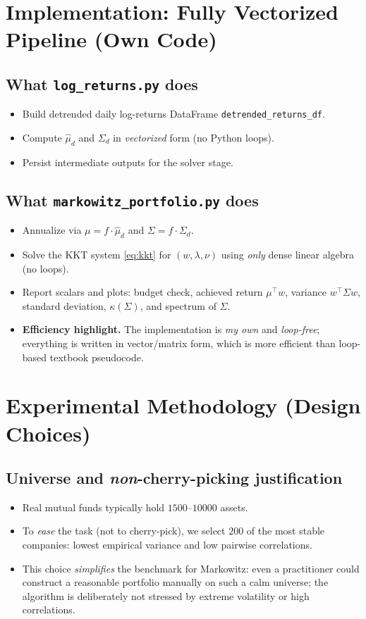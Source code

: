 \documentclass[11pt]{article}
\begin{document}
	\section{Implementation: Fully Vectorized Pipeline (Own Code)}
	\subsection{What \texttt{log\_returns.py} does}
	\begin{itemize}
		\item Build detrended daily log-returns DataFrame \texttt{detrended\_returns\_df}.
		\item Compute $\hat{\mu}_d$ and $\Sigma_d$ in \emph{vectorized} form (no Python loops).
		\item Persist intermediate outputs for the solver stage.
	\end{itemize}
	
	\subsection{What \texttt{markowitz\_portfolio.py} does}
	\begin{itemize}
		\item Annualize via $\mu=f\cdot\hat{\mu}_d$ and $\Sigma=f\cdot\Sigma_d$.
		\item Solve the KKT system \eqref{eq:kkt} for $(w,\lambda,\nu)$ using \emph{only} dense linear algebra (no loops).
		\item Report scalars and plots: budget check, achieved return $\mu^\top w$, variance $w^\top\Sigma w$, standard deviation, $\kappa(\Sigma)$, and spectrum of $\Sigma$.
		\item \textbf{Efficiency highlight.} The implementation is \emph{my own} and \emph{loop-free}; everything is written in vector/matrix form, which is more efficient than loop-based textbook pseudocode.
	\end{itemize}
	
	\section{Experimental Methodology (Design Choices)}
	\subsection{Universe and \emph{non}-cherry-picking justification}
	\begin{itemize}
		\item Real mutual funds typically hold $1500$--$10000$ assets.
		\item To \emph{ease} the task (not to cherry-pick), we select $200$ of the most stable companies: lowest empirical variance and low pairwise correlations.
		\item This choice \emph{simplifies} the benchmark for Markowitz: even a practitioner could construct a reasonable portfolio manually on such a calm universe; the algorithm is deliberately not stressed by extreme volatility or high correlations.
	\end{itemize}
	
\end{document}
